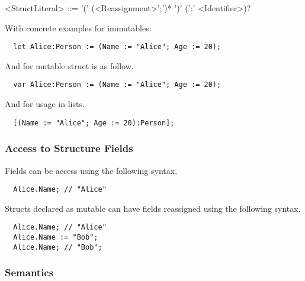 \begin{grammar}
<StructLiteral> ::= '(' (<Reassignment>';')* ')' (':' <Identifier>)?
\end{grammar}


With concrete examples for immutables:

\begin{verbatim}
  let Alice:Person := (Name := "Alice"; Age := 20);
\end{verbatim}

And for mutable struct is as follow.

\begin{verbatim}
  var Alice:Person := (Name := "Alice"; Age := 20);
\end{verbatim}

And for usage in lists.

\begin{verbatim}
  [(Name := "Alice"; Age := 20):Person];
\end{verbatim}

\subsubsection{Access to Structure Fields}
\label{sec:accessStructFields}

Fields can be access using the following syntax.

\begin{verbatim}
  Alice.Name; // "Alice"
\end{verbatim}

Structs declared as mutable can have fields reassigned using the following syntax.

\begin{verbatim}
  Alice.Name; // "Alice"
  Alice.Name := "Bob";
  Alice.Name; // "Bob";
\end{verbatim}
 
\subsubsection{Semantics}

